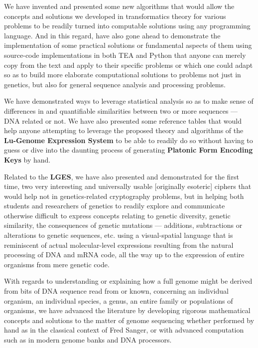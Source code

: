 \documentclass[a4paper, 18pt]{book} %
\begin{document}
We have invented and presented some new algorithms that would allow the concepts and solutions we developed in transformatics theory for various problems to be readily turned into computable solutions using any programming language. And in this regard, have also gone ahead to demonstrate the implementation of some practical solutions or fundamental aspects of them using source-code implementations in both TEA and Python that anyone can merely copy from the text and apply to their specific problems or which one could adapt so as to build more elaborate computational solutions to problems not just in genetics, but also for general sequence analysis and processing problems. 

We have demonstrated ways to leverage statistical analysis so as to make sense of differences in and quantifiable similarities between two or more sequences --- DNA related or not. We have also presented some reference tables that would help anyone attempting to leverage the proposed theory and algorithms of the \textbf{Lu-Genome Expression System} to be able to readily do so without having to guess or dive into the daunting process of generating \textbf{Platonic Form Encoding Keys} by hand. 

Related to the \textbf{LGES}, we have also presented and demonstrated for the first time, two very interesting and universally usable [originally esoteric] ciphers that would help not in genetics-related cryptography problems, but in helping both students and researchers of genetics to readily explore and communicate otherwise difficult to express concepts relating to genetic diversity, genetic similarity, the consequences of genetic mutations --- additions, subtractions or alterations to genetic sequences, etc. using a visual-spatial language that is reminiscent of actual molecular-level expressions resulting from the natural processing of DNA and mRNA code, all the way up to the expression of entire organisms from mere genetic code. 

With regards to understanding or explaining how a full genome might be derived from bits of DNA sequence read from or known, concerning an individual organism, an individual species, a genus, an entire family or populations of organisms, we have advanced the literature by developing rigorous mathematical concepts and solutions to the matter of genome sequencing whether performed by hand as in the classical context of Fred Sanger, or with advanced computation such as in modern genome banks and DNA processors. 
\end{document}
